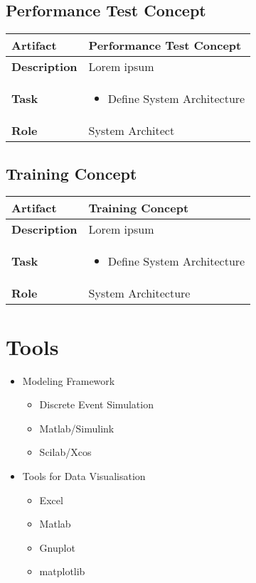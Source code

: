 \subsection{Performance Test Concept}
\begin{minipage}{\textwidth}
 \label{table:ch6_Artifact_Performance_Test_Concept}
\begin{tabular}
	{|m{2cm}|m{10cm}|} \hline \bfseries Artifact & Performance Test Concept\\
	\hline \bfseries Description & Lorem ipsum\\
	\hline \bfseries Task & 
	\begin{itemize}
		\item Define System Architecture 
	\end{itemize}
	\\
	\hline \bfseries Role & System Architect\\
	\hline 
\end{tabular}
\end{minipage}

\subsection{Training Concept}
\begin{minipage}{\textwidth}
 \label{table:ch6_Artifact_Training_Concept}
\begin{tabular}
	{|m{2cm}|m{10cm}|} \hline \bfseries Artifact & Training Concept\\
	\hline \bfseries Description & Lorem ipsum\\
	\hline \bfseries Task & 
	\begin{itemize}
		\item Define System Architecture 
	\end{itemize}
	\\
	\hline \bfseries Role & System Architecture\\
	\hline 
\end{tabular}
\end{minipage}

\section{Tools} %
\label{sec:ch6_tools}

\begin{itemize}
	\item Modeling Framework
	\begin{itemize}
		\item Discrete Event Simulation
		\item Matlab/Simulink
		\item Scilab/Xcos
	\end{itemize}
	\item Tools for Data Visualisation
	\begin{itemize}
		\item Excel
		\item Matlab
		\item Gnuplot
		\item matplotlib
	\end{itemize}
\end{itemize}

